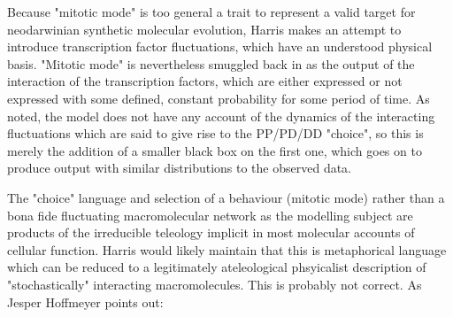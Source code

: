 Because "mitotic mode" is too general a trait to represent a valid target for neodarwinian synthetic molecular evolution, Harris makes an attempt to introduce transcription factor fluctuations, which have an understood physical basis. "Mitotic mode" is nevertheless smuggled back in as the output of the interaction of the transcription factors, which are either expressed or not expressed with some defined, constant probability for some period of time. As noted, the model does not have any account of the dynamics of the interacting fluctuations which are said to give rise to the PP/PD/DD "choice", so this is merely the addition of a smaller black box on the first one, which goes on to produce output with similar distributions to the observed data.

The "choice" language and selection of a behaviour (mitotic mode) rather than a bona fide fluctuating macromolecular network as the modelling subject are products of the irreducible teleology implicit in most molecular accounts of cellular function. Harris would likely maintain that this is metaphorical language which can be reduced to a legitimately ateleological phsyicalist description of "stochastically" interacting macromolecules. This is probably not correct. As Jesper Hoffmeyer points out:

\bigskip

